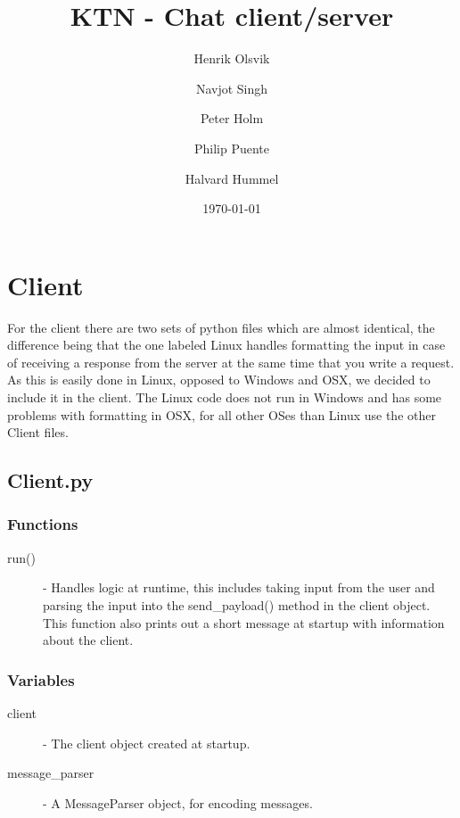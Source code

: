 \documentclass[a4paper, 12pt]{article}
\title{KTN - Chat client/server}
\author{Henrik Olsvik
        \and Navjot Singh
        \and Peter Holm
        \and Philip Puente
        \and Halvard Hummel}
\date{\today}
\begin{document}
\maketitle

\section{Client}
    For the client there are two sets of python files which are almost identical, the difference being that the one labeled Linux handles formatting the input in case of receiving a response from the server at the same time that you write a request. As this is easily done in Linux, opposed to Windows and OSX, we decided to include it in the client. The Linux code does not run in Windows and has some problems with formatting in OSX, for all other OSes than Linux use the other Client files.
    \subsection{Client.py}
        \subsubsection{Functions}
            \begin{description}
                \item[run()] - Handles logic at runtime, this includes taking input from the user and parsing the input into the send\_payload() method in the client object. This function also prints out a short message at startup with information about the client.
            \end{description}
        \subsubsection{Variables}
            \begin{description}
                \item[client] - The client object created at startup.
                \item[message\_parser] - A MessageParser object, for encoding messages.
            \end{description}
\end{document}
